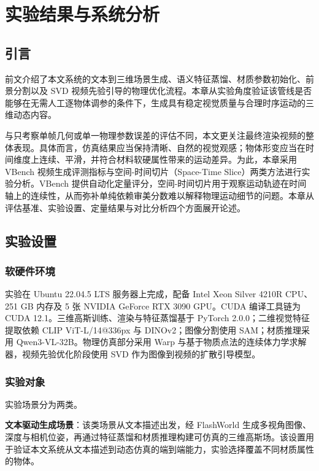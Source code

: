 ﻿\chapter{实验结果与系统分析}

\section{引言}
前文介绍了本文系统的文本到三维场景生成、语义特征蒸馏、材质参数初始化、前景分割以及 SVD 视频先验引导的物理优化流程。本章从实验角度验证该管线是否能够在无需人工逐物体调参的条件下，生成具有稳定视觉质量与合理时序运动的三维动态内容。

与只考察单帧几何或单一物理参数误差的评估不同，本文更关注最终渲染视频的整体表现。具体而言，仿真结果应当保持清晰、自然的视觉观感；物体形变应当在时间维度上连续、平滑，并符合材料软硬属性带来的运动差异。为此，本章采用 VBench\cite{vbench} 视频生成评测指标与空间-时间切片（Space-Time Slice）两类方法进行实验分析。VBench 提供自动化定量评分，空间-时间切片用于观察运动轨迹在时间轴上的连续性，从而弥补单纯依赖审美分数难以解释物理运动细节的问题。本章从评估基准、实验设置、定量结果与对比分析四个方面展开论述。

\section{实验设置}

\subsection{软硬件环境}
实验在 Ubuntu 22.04.5 LTS 服务器上完成，配备 Intel Xeon Silver 4210R CPU、251 GB 内存及 5 张 NVIDIA GeForce RTX 3090 GPU。CUDA 编译工具链为 CUDA 12.1。三维高斯训练、渲染与特征蒸馏基于 PyTorch 2.0.0；二维视觉特征提取依赖 CLIP ViT-L/14@336px\cite{clip} 与 DINOv2\cite{dinov2}；图像分割使用 SAM\cite{sam}；材质推理采用 Qwen3-VL-32B\cite{qwen3vl}。物理仿真部分采用 Warp\cite{warp} 与基于物质点法的连续体力学求解器，视频先验优化阶段使用 SVD\cite{svd} 作为图像到视频的扩散引导模型。

\subsection{实验对象}
实验场景分为两类。

\textbf{文本驱动生成场景}：该类场景从文本描述出发，经 FlashWorld\cite{flashworld} 生成多视角图像、深度与相机位姿，再通过特征蒸馏和材质推理构建可仿真的三维高斯场。该设置用于验证本文系统从文本描述到动态仿真的端到端能力，实验选择覆盖不同材质属性的物体。

